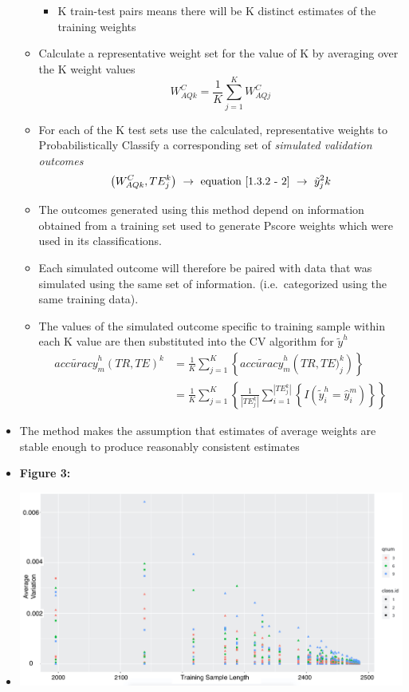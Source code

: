 \documentclass[12pt,]{article}
\providecommand{\tightlist}{%
  \setlength{\itemsep}{0pt}\setlength{\parskip}{0pt}}
\begin{document}
\begin{itemize}
\begin{itemize}
    \begin{itemize}
    \tightlist
    \item
      K train-test pairs means there will be K distinct estimates of the
      training weights
    \end{itemize}
  \item
    Calculate a representative weight set for the value of K by
    averaging over the K weight values
    \[W_{AQk}^{C}=\frac{1}{K}\sum_{j=1}^{K} W_{AQj}^{C}\]
  \item
    For each of the K test sets use the calculated, representative
    weights to Probabilistically Classify a corresponding set of
    \textit{simulated validation outcomes}
    \[\left(W_{AQk}^{C}, TE_{j}^{k}\right)  \ \rightarrow \ \text{equation} \ \eqref{1.3.2 - 2} \ \rightarrow \   \tilde{y}_{j}^2{k}\]
  \item
    The outcomes generated using this method depend on information
    obtained from a training set used to generate Pscore weights which
    were used in its classifications.\\
  \item
    Each simulated outcome will therefore be paired with data that was
    simulated using the same set of information. (i.e.~categorized using
    the same training data).
  \item
    The values of the simulated outcome specific to training sample
    within each K value are then substituted into the CV algorithm for
    \(\tilde{y}^{h}\) \begin{eqnarray*}
      \tilde{accuracy}_{m}^{h}\left(TR, TE \right)^{k} &= \frac{1}{K}\sum_{j=1}^{K} \left \{\tilde{accuracy}_{m}^{h} \left(TR, TE)_{j}^{k}   \right)   \right \} \\
      &= \frac{1}{K}\sum_{j=1}^{K} \left \{ \frac{1}{|TE_{j}^{k}|} \sum_{i=1}^{|TE_{j}^{k}|} \left \{ I\left(\tilde{y}_{i}^{h}=\hat{y}_{i}^{m} \right) \right \}   \right \}
    \end{eqnarray*}
  \end{itemize}
\item
  The method makes the assumption that estimates of average weights are
  stable enough to produce reasonably consistent estimates
\item
  \textbf{Figure 3:}
\item
  \includegraphics{VariancePlot.jpg}

\end{itemize}
\end{document}

